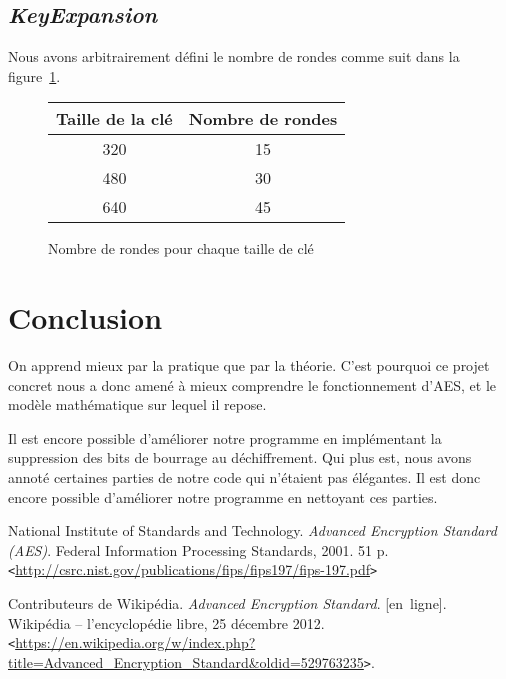 \documentclass[12pt,a4paper]{report}
\newcommand{\burl}[1]{\texttt{<}\url{#1}\texttt{>}}
\begin{document}
\section{\emph{KeyExpansion}}

Nous avons arbitrairement défini le nombre de rondes comme suit dans la
figure~\ref{fig:rondes}.

\begin{figure}[h!]
\centering
\begin{tabular}{|c|c|}
\hline
\textbf{Taille de la clé} & \textbf{Nombre de rondes} \\
\hline
\hline
320 & 15 \\ \hline
480 & 30 \\ \hline
640 & 45 \\ \hline
\end{tabular}
\label{fig:rondes}
\caption{Nombre de rondes pour chaque taille de clé}
\end{figure}

\chapter{Conclusion}

On apprend mieux par la pratique que par la théorie. C'est pourquoi ce projet
concret nous a donc amené à mieux comprendre le fonctionnement d'AES, et le
modèle mathématique sur lequel il repose.

Il est encore possible d'améliorer notre programme en implémentant la
suppression des bits de bourrage au déchiffrement. Qui plus est, nous avons
annoté certaines parties de notre code qui n'étaient pas élégantes. Il est donc
encore possible d'améliorer notre programme en nettoyant ces parties.

\begin{thebibliography}{99}

 National Institute of Standards and Technology.
\emph{Advanced Encryption Standard (AES)}. Federal Information Processing
Standards, 2001. 51 p.
\burl{http://csrc.nist.gov/publications/fips/fips197/fips-197.pdf}

 Contributeurs de Wikipédia. \emph{Advanced Encryption Standard}. [en~ligne].
Wikipédia -- l'encyclopédie libre, 25 décembre 2012. \burl{https://en.wikipedia.org/w/index.php?title=Advanced_Encryption_Standard&oldid=529763235}.

\end{thebibliography}
\end{document}
